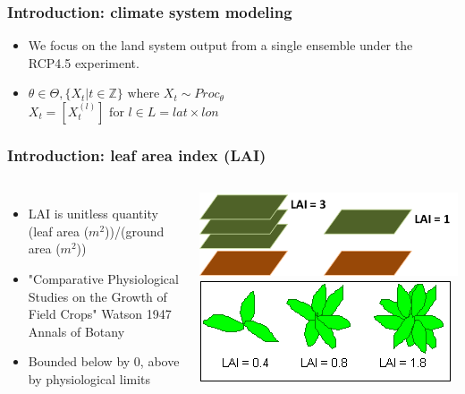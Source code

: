 \documentclass{beamer}
\begin{document}
\begin{frame}
\frametitle{Introduction: climate system modeling}
\begin{itemize}
\item We focus on the land system output from a single ensemble under
the RCP4.5 experiment.

\item $\theta\in\Theta, \{X_t|t\in\mathbb{Z}\} \textrm{ where }
X_t\sim Proc_\theta$\\
$X_t = [X_t^{(l)}] \textrm{ for } l\in L = lat\times lon$
\end{itemize}
\end{frame}

\begin{frame}
\frametitle{Introduction: leaf area index (LAI)}
\begin{columns}

\column{2in}
\begin{itemize}
\item LAI is unitless quantity (leaf area ($m^2$))/(ground area ($m^2$))
\item "Comparative Physiological Studies on the Growth of Field Crops" Watson 1947 Annals of Botany
\item Bounded below by 0, above by physiological limits
\end{itemize}

\column{3in}
\includegraphics[width=\columnwidth,height=\textheight,keepaspectratio]{../img/lai.png}\\
\includegraphics[width=\columnwidth,height=\textheight,keepaspectratio]{../img/lai2.png}

\end{columns}
\end{frame}
\end{document}
